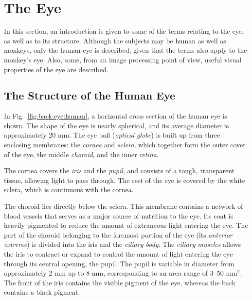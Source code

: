 
\section{The Eye}
\label{back:eye}

In this section, an introduction is given to some of the terms
relating to the eye, as well as to its structure.  Although the
subjects may be human as well as monkeys, only the human eye is
described, given that the terms also apply to the monkey's eye.  Also,
some, from an image processing point of view, useful visual properties
of the eye are described.

\subsection{The Structure of the Human Eye}
\label{back:eye:structure}

In Fig.~\ref{fig:back:eye:human}, a horizontal cross section of the
human eye is shown.  The shape of the eye is nearly spherical, and its
average diameter is approximately 20 mm.  The eye ball ({\em optical
  globe\/}) is built up from three enclosing membranes: the {\em
  cornea\/} and {\em sclera\/}, which together form the outer cover of
the eye, the middle {\em choroid\/}, and the inner {\em retina\/}.

The cornea covers the {\em iris\/} and the {\em pupil\/}, and consists
of a tough, transparent tissue, allowing light to pass through.  The
rest of the eye is covered by the white sclera, which is continuous
with the cornea.

The choroid lies directly below the sclera.  This membrane contains a
network of blood vessels that serves as a major source of nutrition to
the eye.  Its coat is heavily pigmented to reduce the amount of
extraneous light entering the eye.  The part of the choroid belonging
to the foremost portion of the eye (its {\em anterior extreme\/}) is
divided into the iris and the {\em ciliary body\/}.  The {\em ciliary
  muscles\/} allows the iris to contract or expand to control the
amount of light entering the eye through its central opening, the
pupil.  The pupil is variable in diameter from approximately 2 mm up
to 8 mm, corresponding to an area range of 3--50 mm$^{2}$.  The front
of the iris contains the visible pigment of the eye, whereas the back
contains a black pigment.

